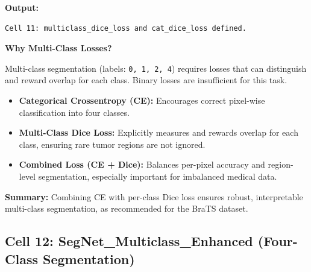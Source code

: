 \noindent\textbf{Output:}
\begin{lstlisting}[style=output]
Cell 11: multiclass_dice_loss and cat_dice_loss defined.
\end{lstlisting}


\noindent\textbf{Why Multi-Class Losses?}

Multi-class segmentation (labels: \texttt{0, 1, 2, 4}) requires losses that can distinguish and reward overlap for each class. Binary losses are insufficient for this task.

\begin{itemize}
    \item \textbf{Categorical Crossentropy (CE):} Encourages correct pixel-wise classification into four classes.
    \item \textbf{Multi-Class Dice Loss:} Explicitly measures and rewards overlap for each class, ensuring rare tumor regions are not ignored.
    \item \textbf{Combined Loss (CE + Dice):} Balances per-pixel accuracy and region-level segmentation, especially important for imbalanced medical data.
\end{itemize}

\noindent\textbf{Summary:}  
Combining CE with per-class Dice loss ensures robust, interpretable multi-class segmentation, as recommended for the BraTS dataset.

\subsection{Cell 12: SegNet\_Multiclass\_Enhanced (Four-Class Segmentation)}

